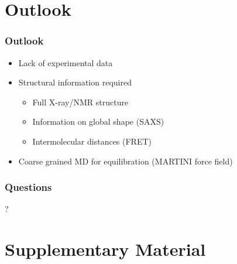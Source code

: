\documentclass[english]{beamer}
\begin{document}

\section{Outlook}

\begin{frame}
    \frametitle{Outlook}


    \begin{itemize}
        \item<1-> Lack of experimental data
        \item<2-> Structural information required
            \begin{itemize}
                \item<2-> Full X-ray/NMR structure
                \item<2-> Information on global shape (SAXS)
                \item<2-> Intermolecular distances (FRET)
            \end{itemize}
        \item<3-> Coarse grained MD for equilibration (MARTINI force field)
    \end{itemize}


\end{frame}   


\begin{frame}
    \frametitle{Questions}

    \vfill
    \centering
    \Huge ?
    \vfill


\end{frame}   
 


\section{Supplementary Material}
\end{document}
